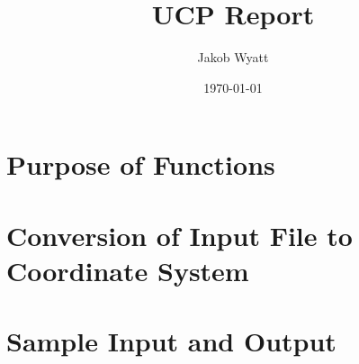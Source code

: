 \documentclass{article}
\title{UCP Report}
\date{\today}
\author{Jakob Wyatt}
\begin{document}
\maketitle
\pagebreak
\tableofcontents
\pagebreak

\section{Purpose of Functions}
\section{Conversion of Input File to Coordinate System}
\section{Sample Input and Output}
\end{document}
